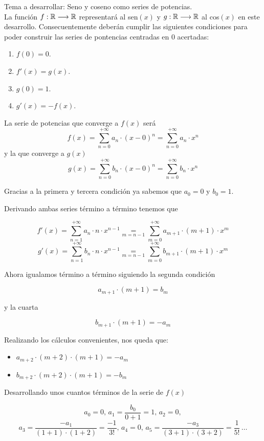 \documentclass[12pt]{article}
\begin{document}
	\begin{ejercicio}[2 puntos]
		Tema a desarrollar: Seno y coseno como series de potencias. \\
		
		La función $f:\mathbb{R}\longrightarrow\mathbb{R}$ representará al sen$(x)$ y $g:\mathbb{R}\longrightarrow\mathbb{R}$ al cos$(x)$ en este desarrollo.
		Consecuentemente deberán cumplir las siguientes condiciones para poder construir las series de pontencias centradas en 0 acertadas:
		\begin{enumerate}
			\item $f(0)=0$.
			\item $f'(x) = g(x)$.
			\item $g(0)=1$.
			\item $g'(x)=-f(x)$.
		\end{enumerate}
		
		La serie de potencias que converge a $f(x)$ será
		$$ f(x) = \sum_{n=0}^{+\infty} a_n\cdot (x-0)^n = \sum_{n=0}^{+\infty} a_n\cdot x^n$$
		y la que converge a $g(x)$
		$$ g(x)= \sum_{n=0}^{+\infty} b_n\cdot (x-0)^n = \sum_{n=0}^{+\infty} b_n\cdot x^n$$
		
		Gracias a la primera y tercera condición ya sabemos que $a_0=0$ y $b_0=1$.
		
		Derivando ambas series término a término tenemos que
		
		$$f'(x) = \sum_{n=1}^{+\infty} a_n\cdot n \cdot x^{n-1} \underset{m=n-1}{=} \sum_{m=0}^{+\infty} a_{m+1}\cdot (m+1) \cdot x^{m}$$
		$$g'(x) = \sum_{n=1}^{+\infty} b_n\cdot n \cdot x^{n-1} \underset{m=n-1}{=} \sum_{m=0}^{+\infty} b_{m+1}\cdot (m+1) \cdot x^{m}$$
		
		Ahora igualamos término a término siguiendo la segunda condición
		
		$$ a_{m+1}\cdot (m+1) = b_m $$
		
		y la cuarta
		
		$$ b_{m+1}\cdot (m+1) = -a_m$$
		
		Realizando los cálculos convenientes, nos queda que:
		\begin{itemize}
			\item $a_{m+2}\cdot (m+2) \cdot (m+1) = -a_m$
			\item $b_{m+2}\cdot (m+2) \cdot (m+1) = -b_m$
		\end{itemize}
		
		Desarrollando unos cuantos términos de la serie de $f(x)$
		
		$$ a_0=0, \, a_1 = \frac{b_0}{0+1} = 1, \, a_2 = 0, $$ 
		$$ a_3 = \frac{-a_1}{(1+1) \cdot (1+2)} = \frac{-1}{3!}, \, a_4=0, \, a_5 = \frac{-a_3}{(3+1)\cdot(3+2)} = \frac{1}{5!} \, \ldots $$
		

\end{ejercicio}
\end{document}
